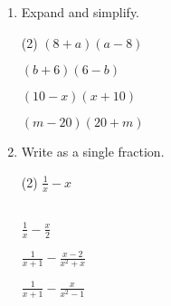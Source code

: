 \begin{enumerate} [leftmargin=0cm]
\item Expand and simplify.
\begin{tasks}[label=(\arabic*), after-item-skip=2pt,after-skip=3pt, label-width=4ex](2)
    \task  $ ( 8+ a) (a-8)                 $    \\  \begin{envAnswer} { }\end{envAnswer}
    \task  $ ( b+ 6) (6-b)                 $    \\  \begin{envAnswer} { }\end{envAnswer}
    \task  $ (10-x ) (x+10)                $    \\  \begin{envAnswer} { }\end{envAnswer}
    \task  $ ( m-20) (20+m)                $    \\  \begin{envAnswer} { }\end{envAnswer}

\end{tasks}

\clearpage
\item Write as a single fraction.
\begin{tasks}[label=(\arabic*), after-item-skip=2pt,after-skip=3pt, label-width=4ex](2)
    \task  $ \frac{1}{x}-x                          $    
	                                                     \\ 
	                                                     \\  \begin{envAnswer} { }\end{envAnswer}
    \task  $ \frac{1}{x}-\frac{x}{2}                $    \\  \begin{envAnswer} { }\end{envAnswer}
    \task  $ \frac{1}{x+1}-\frac{x-2}{x^2+x}        $    \\  \begin{envAnswer} { }\end{envAnswer}
    \task  $ \frac{1}{x+1}-\frac{x}{x^2-1}          $    \\
    

\end{tasks}
\end{enumerate}
